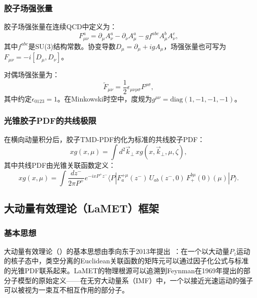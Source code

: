 \documentclass[12pt,a4paper]{ctexart}
\theoremstyle{definition}
\newcommand{\LaMET}{\text{LaMET}}
\begin{document}
\subsubsection{胶子场强张量}

胶子场强张量在连续QCD中定义为：
\begin{equation}\label{eq:F_def}
    F^a_{\mu\nu} = \partial_\mu A^a_\nu - \partial_\nu A^a_\mu - g f^{abc} A^b_\mu A^c_\nu,
\end{equation}
其中$f^{abc}$是SU(3)结构常数。协变导数$D_\mu = \partial_\mu + i g A_\mu$，场强张量也可写为$F_{\mu\nu} = -i [D_\mu, D_\nu]$。

对偶场强张量为：
\begin{equation}\label{eq:F_dual}
    \tilde{F}_{\mu\nu} = \frac{1}{2} \epsilon_{\mu\nu\rho\sigma} F^{\rho\sigma},
\end{equation}
其中约定$\epsilon_{0123} = 1$。在Minkowski时空中，度规为$g^{\mu\nu} = \text{diag}(1,-1,-1,-1)$。

\subsubsection{光锥胶子PDF的共线极限}

在横向动量积分后，胶子TMD-PDF约化为标准的共线胶子PDF：
\begin{equation}\label{eq:tmd_to_collinear}
    x g(x, \mu) = \int d^2\vec{k}_\perp \, x g(x, \vec{k}_\perp, \mu, \zeta),
\end{equation}
其中共线PDF由光锥关联函数定义：
\begin{equation}\label{eq:lightcone_collinear}
    x g(x, \mu) = \int \frac{dz^-}{2\pi P^+} e^{-ixP^+z^-} \langle P | F^{+\mu}_a(z^-) \, U_{ab}(z^-,0) \, F^{b\mu}_{+}(0)(\mu) | P \rangle.
\end{equation}

\subsection{大动量有效理论（LaMET）框架}

\subsubsection{基本思想}

大动量有效理论（\LaMET{}）的基本思想由季向东于2013年提出~\cite{Ji:2013dva,Ji:2014gla}：在一个以大动量$P_z$运动的核子态中，类空分离的Euclidean关联函数的矩阵元可以通过因子化公式与标准的光锥PDF联系起来。LaMET的物理根源可以追溯到Feynman在1969年提出的部分子模型的原始定义——在无穷大动量系（IMF）中，一个以接近光速运动的强子可以被视为一束互不相互作用的部分子。
\end{document}
